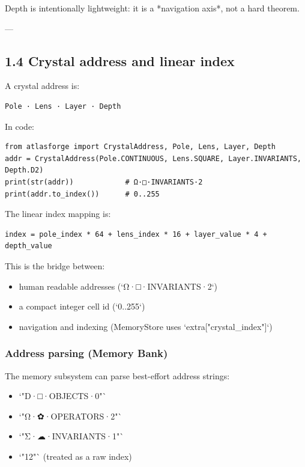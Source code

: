 \documentclass[11pt]{article}
\begin{document}
Depth is intentionally lightweight: it is a *navigation axis*, not a hard theorem.

---

\subsection{1.4 Crystal address and linear index}

A crystal address is:

\begin{lstlisting}
Pole · Lens · Layer · Depth
\end{lstlisting}

In code:

\begin{lstlisting}
from atlasforge import CrystalAddress, Pole, Lens, Layer, Depth
addr = CrystalAddress(Pole.CONTINUOUS, Lens.SQUARE, Layer.INVARIANTS, Depth.D2)
print(str(addr))            # Ω·□·INVARIANTS·2
print(addr.to_index())      # 0..255
\end{lstlisting}

The linear index mapping is:

\begin{lstlisting}
index = pole_index * 64 + lens_index * 16 + layer_value * 4 + depth_value
\end{lstlisting}

This is the bridge between:
\begin{itemize}
\item human readable addresses (`Ω·□·INVARIANTS·2`)
\item a compact integer cell id (`0..255`)
\item navigation and indexing (MemoryStore uses `extra["crystal\_index"]`)
\end{itemize}

\subsubsection{Address parsing (Memory Bank)}
The memory subsystem can parse best-effort address strings:

\begin{itemize}
\item `"D·□·OBJECTS·0"`
\item `"Ω·✿·OPERATORS·2"`
\item `"Σ·☁·INVARIANTS·1"`
\item `"12"` (treated as a raw index)
\end{itemize}
\end{document}
